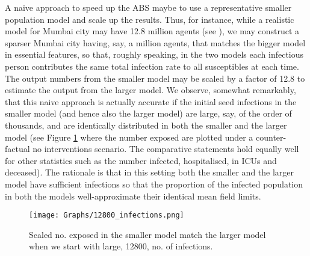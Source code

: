 \documentclass{article}
\theoremstyle{definition}
\begin{document}
A naive approach to speed up the ABS maybe to use a representative smaller population model and scale up the results. Thus, for instance, while a realistic model for Mumbai city may have 12.8 million agents (see \cite{May_report_2021}), we may construct a sparser Mumbai city having, say, a million agents,  that matches the bigger model in essential features, so that, roughly speaking, in the two models each infectious person contributes the same total infection  rate to all susceptibles at each time. The output numbers from the smaller model may be scaled by a factor of 12.8 to estimate the output from the larger model. We observe, somewhat remarkably, that this naive approach is actually accurate  if the initial seed infections in the smaller model (and hence also the larger model) are large, say, of the order  of thousands, 
and are identically distributed in both the smaller and the larger model 
(see Figure \ref{12800_infections} where the number exposed are plotted under a counter-factual no interventions scenario. The comparative statements hold
equally well for other statistics such as the number infected, hospitalised, in ICUs and deceased). 
The rationale is that in this setting both the smaller and the larger model have sufficient infections so that 
the proportion of the infected population in both the models
well-approximate their identical mean field limits.
 
 
 \begin{figure}
      \centering
 \texttt{[image: Graphs/12800\_infections.png]}   
    \caption{Scaled no. exposed in the smaller model match the larger model when we start with large, 12800, no. of infections. } 
    \label{12800_infections}
  \end{figure}
 
\end{document}
